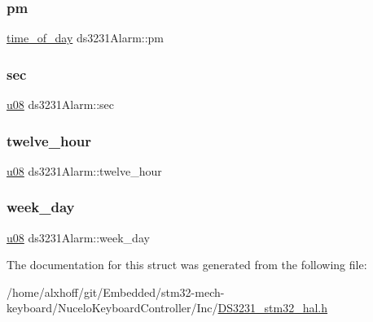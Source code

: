 \mbox{\label{structds3231Alarm_a5a7965959880bef167f10a9629ba2e53}} 
\subsubsection{\texorpdfstring{pm}{pm}}
{\footnotesize\ttfamily \hyperlink{DS3231__stm32__hal_8h_ab6153795b3885e1d0215e3c26f302eea}{time\+\_\+of\+\_\+day} ds3231\+Alarm\+::pm}

\mbox{\label{structds3231Alarm_a0e7f1bac1543fd4b07f520475dbaed8b}} 
\subsubsection{\texorpdfstring{sec}{sec}}
{\footnotesize\ttfamily \hyperlink{main_8h_ae2b6b8613a28b013c8c7fdaf93cdb1e1}{u08} ds3231\+Alarm\+::sec}

\mbox{\label{structds3231Alarm_a206a78c872094a2b29a9de7b758f5a6d}} 
\subsubsection{\texorpdfstring{twelve\+\_\+hour}{twelve\_hour}}
{\footnotesize\ttfamily \hyperlink{main_8h_ae2b6b8613a28b013c8c7fdaf93cdb1e1}{u08} ds3231\+Alarm\+::twelve\+\_\+hour}

\mbox{\label{structds3231Alarm_ad6a342ecb299dc1b06d197f6cbf8bef1}} 
\subsubsection{\texorpdfstring{week\+\_\+day}{week\_day}}
{\footnotesize\ttfamily \hyperlink{main_8h_ae2b6b8613a28b013c8c7fdaf93cdb1e1}{u08} ds3231\+Alarm\+::week\+\_\+day}



The documentation for this struct was generated from the following file\+:\begin{DoxyCompactItemize}
\item 
/home/alxhoff/git/\+Embedded/stm32-\/mech-\/keyboard/\+Nucelo\+Keyboard\+Controller/\+Inc/\hyperlink{DS3231__stm32__hal_8h}{D\+S3231\+\_\+stm32\+\_\+hal.\+h}\end{DoxyCompactItemize}
